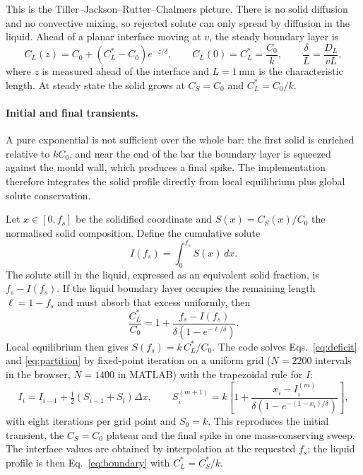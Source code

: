 \documentclass[11pt,a4paper]{article}
\begin{document}
This is the Tiller--Jackson--Rutter--Chalmers picture. There is no solid
diffusion and no convective mixing, so rejected solute can only spread by
diffusion in the liquid. Ahead of a planar interface moving at $v$, the steady
boundary layer is
\begin{equation}
  C_L(z) = C_0 + \left(C_L^*-C_0\right)e^{-z/\delta},
  \qquad
  C_L(0)=C_L^*=\frac{C_0}{k},
  \qquad
  \boxed{\frac{\delta}{L}=\frac{D_L}{vL}},
  \label{eq:boundary}
\end{equation}
where $z$ is measured ahead of the interface and $L=1$\,mm is the
characteristic length. At steady state the solid grows at $C_S=C_0$ and
$C_L^*=C_0/k$.

\paragraph{Initial and final transients.} A pure exponential is not sufficient
over the whole bar: the first solid is enriched relative to $kC_0$, and near
the end of the bar the boundary layer is squeezed against the mould wall, which
produces a final spike. The implementation therefore integrates the solid
profile directly from local equilibrium plus global solute conservation.

Let $x\in[0,f_s]$ be the solidified coordinate and $S(x)=C_S(x)/C_0$ the
normalised solid composition. Define the cumulative solute
\begin{equation}
  I(f_s)=\int_0^{f_s} S(x)\,dx .
\end{equation}
The solute still in the liquid, expressed as an equivalent solid fraction, is
$f_s-I(f_s)$. If the liquid boundary layer occupies the remaining length
$\ell=1-f_s$ and must absorb that excess uniformly, then
\begin{equation}
  \frac{C_L^*}{C_0}=1+\frac{f_s-I(f_s)}{\delta\left(1-e^{-\ell/\delta}\right)} .
  \label{eq:deficit}
\end{equation}
Local equilibrium then gives $S(f_s)=k\,C_L^*/C_0$. The code solves
Eqs.~\eqref{eq:deficit} and \eqref{eq:partition} by fixed-point iteration on a
uniform grid ($N=2200$ intervals in the browser, $N=1400$ in MATLAB) with the
trapezoidal rule for $I$:
\begin{equation}
  I_i = I_{i-1}+\tfrac12\left(S_{i-1}+S_i\right)\Delta x,
  \qquad
  S_i^{(m+1)} = k\left[1+\frac{x_i-I_i^{(m)}}{\delta\left(1-e^{-(1-x_i)/\delta}\right)}\right],
\end{equation}
with eight iterations per grid point and $S_0=k$. This reproduces the initial
transient, the $C_S=C_0$ plateau and the final spike in one mass-conserving
sweep. The interface values are obtained by interpolation at the requested
$f_s$; the liquid profile is then Eq.~\eqref{eq:boundary} with
$C_L^*=C_S^*/k$.
\end{document}
